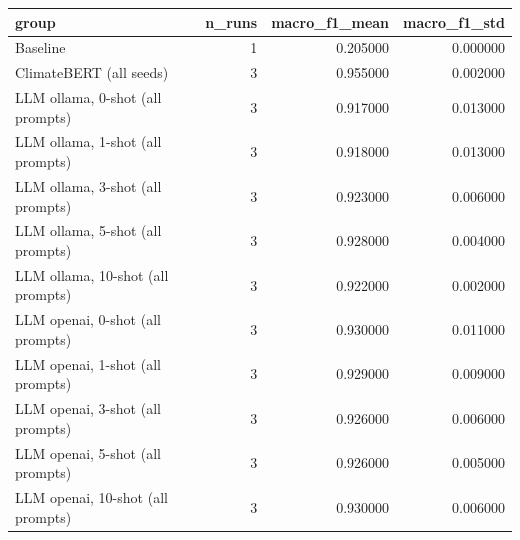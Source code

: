 \begin{tabular}{lrrr}
\toprule
group & n_runs & macro_f1_mean & macro_f1_std \\
\midrule
Baseline & 1 & 0.205000 & 0.000000 \\
ClimateBERT (all seeds) & 3 & 0.955000 & 0.002000 \\
LLM ollama, 0-shot (all prompts) & 3 & 0.917000 & 0.013000 \\
LLM ollama, 1-shot (all prompts) & 3 & 0.918000 & 0.013000 \\
LLM ollama, 3-shot (all prompts) & 3 & 0.923000 & 0.006000 \\
LLM ollama, 5-shot (all prompts) & 3 & 0.928000 & 0.004000 \\
LLM ollama, 10-shot (all prompts) & 3 & 0.922000 & 0.002000 \\
LLM openai, 0-shot (all prompts) & 3 & 0.930000 & 0.011000 \\
LLM openai, 1-shot (all prompts) & 3 & 0.929000 & 0.009000 \\
LLM openai, 3-shot (all prompts) & 3 & 0.926000 & 0.006000 \\
LLM openai, 5-shot (all prompts) & 3 & 0.926000 & 0.005000 \\
LLM openai, 10-shot (all prompts) & 3 & 0.930000 & 0.006000 \\
\bottomrule
\end{tabular}

